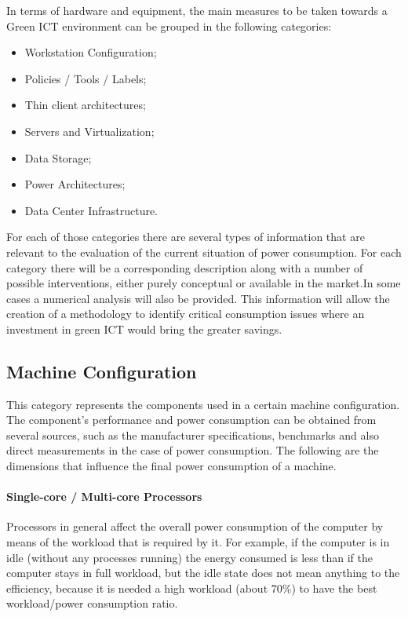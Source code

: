     In terms of hardware and equipment, the main measures to be taken towards a Green ICT environment can be grouped in the following categories:
    \begin{itemize}
        \item Workstation Configuration;
        \item Policies / Tools / Labels;
        \item Thin client architectures;
        \item Servers and Virtualization;
        \item Data Storage;
        \item Power Architectures;
        \item Data Center Infrastructure.
    \end{itemize}
    For each of those categories there are several types of information that are relevant to the evaluation of the current situation of power consumption. For each category there will be a corresponding description along with a number of possible interventions, either purely conceptual or available in the market.In some cases a numerical analysis will also be provided. This information will allow the creation of a methodology to identify critical consumption issues where an investment in green ICT would bring the greater savings.
    
    \subsection{Machine Configuration}\label{sec2:machine_configuration}
        This category represents the components used in a certain machine configuration. The component's performance and power consumption can be obtained from several sources, such as the manufacturer specifications, benchmarks and also direct measurements in the case of power consumption.
        The following are the dimensions that influence the final power consumption of a machine.
            \paragraph*{Single-core / Multi-core Processors} Processors in general affect the overall power consumption of the computer by means of the workload that is required by it. For example, if the computer is in idle (without any processes running) the energy consumed is less than if the computer stays in full workload, but the idle state does not mean anything to the efficiency, because it is needed a high workload (about 70\%) to have the best workload/power consumption ratio.
